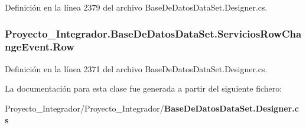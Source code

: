 Definición en la línea 2379 del archivo Base\-De\-Datos\-Data\-Set.\-Designer.\-cs.

\subsubsection[{Row}]{ Proyecto\-\_\-\-Integrador.\-Base\-De\-Datos\-Data\-Set.\-Servicios\-Row\-Change\-Event.\-Row\hspace{0.3cm}{\ttfamily [get]}}\label{class_proyecto___integrador_1_1_base_de_datos_data_set_1_1_servicios_row_change_event_a081f8d04f13a660d0de9c8bbb127ca3d}


Definición en la línea 2371 del archivo Base\-De\-Datos\-Data\-Set.\-Designer.\-cs.



La documentación para esta clase fue generada a partir del siguiente fichero\-:\begin{DoxyCompactItemize}
\item 
Proyecto\-\_\-\-Integrador/\-Proyecto\-\_\-\-Integrador/{\bf Base\-De\-Datos\-Data\-Set.\-Designer.\-cs}\end{DoxyCompactItemize}
